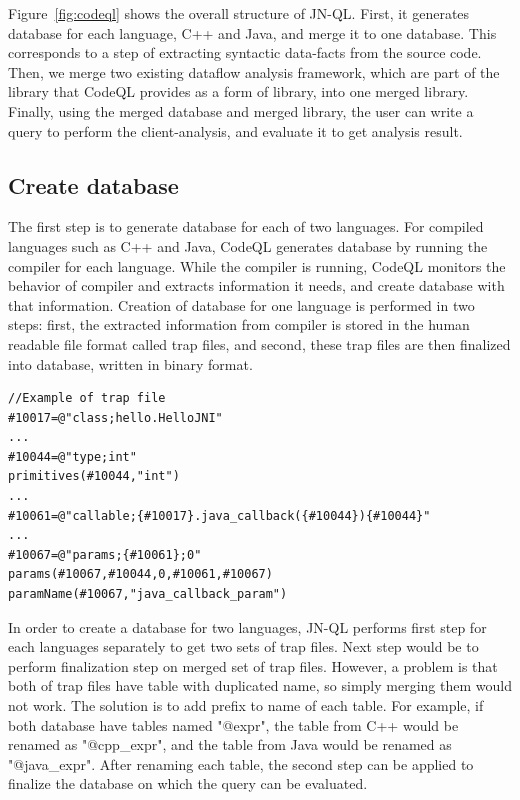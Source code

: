 Figure~\ref{fig:codeql} shows the overall structure of JN-QL. First, it generates database
for each language, C++ and Java, and merge it to one database. This corresponds
to a step of extracting syntactic data-facts from the source code. Then, we
merge two existing dataflow analysis framework, which are part of the library
that CodeQL provides as a form of library, into one merged library. Finally,
using the merged database and merged library, the user can write a query to
perform the client-analysis, and evaluate it to get analysis result.

\subsection{Create database}
The first step is to generate database for each of two languages.  For
compiled languages such as C++ and Java, CodeQL generates database by running
the compiler for each language. While the compiler is running, CodeQL monitors
the behavior of compiler and extracts information it needs, and create database
with that information.  Creation of database for one language is performed in
two steps: first, the extracted information from compiler is stored in the
human readable file format called trap files, and second, these trap files are
then finalized into database, written in binary format.

\begin{lstlisting}[style=java,numbers=none,xleftmargin=2.5em]
//Example of trap file
#10017=@"class;hello.HelloJNI"
...
#10044=@"type;int"
primitives(#10044,"int")
...
#10061=@"callable;{#10017}.java_callback({#10044}){#10044}"
...
#10067=@"params;{#10061};0"
params(#10067,#10044,0,#10061,#10067)
paramName(#10067,"java_callback_param")
\end{lstlisting}

In order to create a database for two languages, JN-QL performs first step for
each languages separately to get two sets of trap files.  Next step would be to
perform finalization step on merged set of trap files. However, a problem is that
both of trap files have table with duplicated name, so simply merging them would not work.
The solution is to add prefix to name of each table. For example, if both
database have tables named "@expr", the table from C++ would be renamed as
"@cpp\_expr", and the table from Java would be renamed as "@java\_expr". After
renaming each table, the second step can be applied to finalize the database on
which the query can be evaluated.

